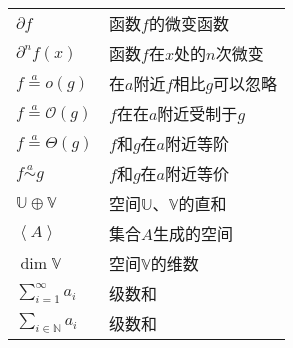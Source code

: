 \documentclass[12pt,UTF8]{article}
\newcommand{\oveq}[1]{\overset{#1}{=}}
\newcommand{\olim}[1]{\mathit{o}\left(#1\right)}  %
\newcommand{\Olim}[1]{\mathcal{O}\left(#1\right)}  %
\newcommand{\Tlim}[1]{\mathcal{\Theta}\left(#1\right)}  %
\newcommand{\eqlim}[1]{\overset{#1}{\sim}}  %
\newcommand{\vect}[1]{\left\langle #1 \right\rangle}
\begin{document}
\begin{longtable}{ m{15em} m{15em} }
    $\partial f$ & 函数$f$的微变函数 \\
    $\partial^n f(x)$ & 函数$f$在$x$处的$n$次微变 \\
    $ f \oveq{a} \olim{g}$ & 在$a$附近$f$相比$g$可以忽略 \\
    $ f \oveq{a} \Olim{g}$ & $f$在在$a$附近受制于$g$ \\
    $ f \oveq{a} \Tlim{g}$ & $f$和$g$在$a$附近等阶 \\
    $ f \eqlim{a} g$ & $f$和$g$在$a$附近等价 \\
    $\mathbb{U} \oplus \mathbb{V}$ & 空间$\mathbb{U}$、$\mathbb{V}$的直和 \\
    $\vect{A}$ & 集合$A$生成的空间 \\
    $\dim{\mathbb{V}}$ & 空间$\mathbb{V}$的维数 \\
    $\displaystyle\sum_{i=1}^\infty a_i$ & 级数和 \\
    $\displaystyle\sum_{i\in\mathbb{N}} a_i$ & 级数和 \\


\end{longtable}
\end{document}
